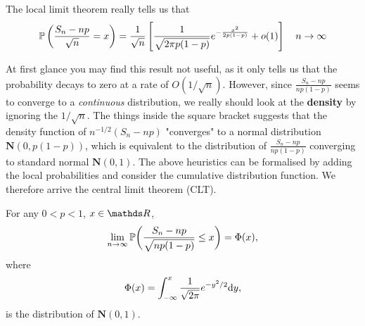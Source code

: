 The local limit theorem really tells us that 
\begin{equation}
    \mathbb{P}\left( \frac{S_n - np}{\sqrt{n}} = x \right) = \frac{1}{\sqrt{n}} \left[  \frac{1}{\sqrt{2 \pi p (1-p)}} e^{-\frac{x^2}{2p(1-p)}} + o(1) \right] \quad n \rightarrow \infty
\end{equation}

At first glance you may find this result not useful, as it only tells us that the probability decays to zero at a rate of $O(1/\sqrt{n})$. However, since $\displaystyle{\frac{S_n - np}{np(1-p)}}$ seems to converge to a \textit{continuous} distribution, we really should look at the \textbf{density} by ignoring the $1/\sqrt{n}$. The things inside the square bracket suggests that the density function of $n^{-1/2} (S_n-np)$ "converges" to a normal distribution $\mathbf{N}(0,p(1-p))$, which is equivalent to the distribution of  $\displaystyle{\frac{S_n - np}{np(1-p)}}$ converging to standard normal $\mathbf{N}(0,1)$. The above heuristics can be formalised by adding the local probabilities and consider the cumulative distribution function. We therefore arrive the central limit theorem (CLT).

\begin{theorem} \label{thm:deMoivre_CLT}
For any $0 < p < 1$, $x \in \R$, 
\begin{equation*}
    \lim_{n \rightarrow \infty} \mathbb{P} \bigg(\frac{S_n - np}{\sqrt{np(1-p)}} \le x \bigg) = \Phi (x),
\end{equation*}
where 
\begin{equation*}
    \Phi(x) = \int_{-\infty}^x \frac{1}{\sqrt{2 \pi}} e^{-y^2/2} \mathrm{d} y,
\end{equation*}
is the distribution of $\textbf{N}(0,1)$.
\end{theorem}

